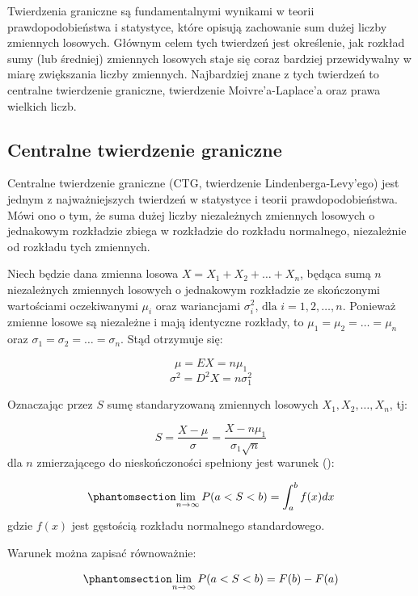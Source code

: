 \documentclass[
  letterpaper,
  DIV=11,
  numbers=noendperiod]{scrreprt}
\begin{document}
Twierdzenia graniczne są fundamentalnymi wynikami w teorii
prawdopodobieństwa i statystyce, które opisują zachowanie sum dużej
liczby zmiennych losowych. Głównym celem tych twierdzeń jest określenie,
jak rozkład sumy (lub średniej) zmiennych losowych staje się coraz
bardziej przewidywalny w miarę zwiększania liczby zmiennych. Najbardziej
znane z tych twierdzeń to centralne twierdzenie graniczne, twierdzenie
Moivre'a-Laplace'a oraz prawa wielkich liczb.

\subsection{Centralne twierdzenie
graniczne}\label{centralne-twierdzenie-graniczne}

Centralne twierdzenie graniczne (CTG, twierdzenie Lindenberga-Levy'ego)
jest jednym z najważniejszych twierdzeń w statystyce i teorii
prawdopodobieństwa. Mówi ono o tym, że suma dużej liczby niezależnych
zmiennych losowych o jednakowym rozkładzie zbiega w rozkładzie do
rozkładu normalnego, niezależnie od rozkładu tych zmiennych.

Niech będzie dana zmienna losowa \(X=X_1+X_2+\ldots+X_n\), będąca sumą
\(n\) niezależnych zmiennych losowych o jednakowym rozkładzie ze
skończonymi wartościami oczekiwanymi \(\mu_i\) oraz wariancjami
\(\sigma_i^2 \text{, dla } i=1,2,\ldots,n\). Ponieważ zmienne losowe są
niezależne i mają identyczne rozkłady, to \(\mu_1=\mu_2=\ldots=\mu_n\)
oraz \(\sigma_1=\sigma_2=\ldots=\sigma_n\). Stąd otrzymuje się:

\[\mu=EX=n \mu_1\] \[\sigma^2=D^2X=n\sigma_1^2\]

Oznaczając przez \(S\) sumę standaryzowaną zmiennych losowych
\(X_1, X_2, \ldots, X_n\), tj:

\[S=\frac{X-\mu}{\sigma}=\frac{X-n \mu_1}{\sigma_1 \sqrt{n}}\] dla \(n\)
zmierzającego do nieskończoności spełniony jest warunek
():

\begin{equation}\phantomsection\label{eq-ctg1}{\lim_{n \to \infty} P(a < S < b) = \int_a^b f(x)dx}\end{equation}
gdzie \(f(x)\) jest gęstością rozkładu normalnego standardowego.

Warunek można zapisać równoważnie:

\begin{equation}\phantomsection\label{eq-ctg2}{\lim_{n \to \infty} P(a < S < b) = F(b) - F(a)}\end{equation}
\end{document}

